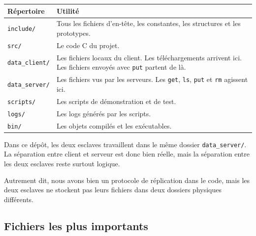 \documentclass[a4paper,11pt]{article}
\begin{document}
\begin{center}
\small
\begin{tabularx}{\textwidth}{@{}L{0.22\textwidth}L{0.70\textwidth}@{}}
\toprule
\textbf{Répertoire} & \textbf{Utilité} \\
\midrule
\texttt{include/} & Tous les fichiers d'en-tête, les constantes, les structures et les prototypes. \\
\texttt{src/} & Le code C du projet. \\
\texttt{data\_client/} & Les fichiers locaux du client. Les téléchargements arrivent ici. Les fichiers envoyés avec \texttt{put} partent de là. \\
\texttt{data\_server/} & Les fichiers vus par les serveurs. Les \texttt{get}, \texttt{ls}, \texttt{put} et \texttt{rm} agissent ici. \\
\texttt{scripts/} & Les scripts de démonstration et de test. \\
\texttt{logs/} & Les logs générés par les scripts. \\
\texttt{bin/} & Les objets compilés et les exécutables. \\
\bottomrule
\end{tabularx}
\end{center}

\begin{warningbox}
Dans ce dépôt, les deux esclaves travaillent dans le même dossier
\texttt{data\_server/}. La séparation entre client et serveur est donc bien
réelle, mais la séparation entre les deux esclaves reste surtout logique.

Autrement dit, nous avons bien un protocole de réplication dans le code, mais
les deux esclaves ne stockent pas leurs fichiers dans deux dossiers physiques
différents.
\end{warningbox}

\subsection{Fichiers les plus importants}
\end{document}
